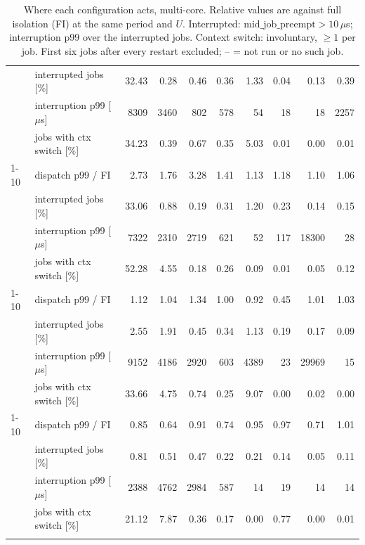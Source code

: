\begin{longtable}{ll|rrrr|rrrr}
 & interrupted jobs [\%] & 32.43 & 0.28 & 0.46 & 0.36 & 1.33 & 0.04 & 0.13 & 0.39 \\
 & interruption p99 [$\mu$s] & 8309 & 3460 & 802 & 578 & 54 & 18 & 18 & 2257 \\
 & jobs with ctx switch [\%] & 34.23 & 0.39 & 0.67 & 0.35 & 5.03 & 0.01 & 0.00 & 0.01 \\
\cmidrule{1-10}
\multirow[t]{4}{*}{IRQ steering reverted} & dispatch p99 / FI & 2.73 & 1.76 & 3.28 & 1.41 & 1.13 & 1.18 & 1.10 & 1.06 \\
 & interrupted jobs [\%] & 33.06 & 0.88 & 0.19 & 0.31 & 1.20 & 0.23 & 0.14 & 0.15 \\
 & interruption p99 [$\mu$s] & 7322 & 2310 & 2719 & 621 & 52 & 117 & 18300 & 28 \\
 & jobs with ctx switch [\%] & 52.28 & 4.55 & 0.18 & 0.26 & 0.09 & 0.01 & 0.05 & 0.12 \\
\cmidrule{1-10}
\multirow[t]{4}{*}{frequency pinning reverted} & dispatch p99 / FI & 1.12 & 1.04 & 1.34 & 1.00 & 0.92 & 0.45 & 1.01 & 1.03 \\
 & interrupted jobs [\%] & 2.55 & 1.91 & 0.45 & 0.34 & 1.13 & 0.19 & 0.17 & 0.09 \\
 & interruption p99 [$\mu$s] & 9152 & 4186 & 2920 & 603 & 4389 & 23 & 29969 & 15 \\
 & jobs with ctx switch [\%] & 33.66 & 4.75 & 0.74 & 0.25 & 9.07 & 0.00 & 0.02 & 0.00 \\
\cmidrule{1-10}
\multirow[t]{4}{*}{boot-params bundle reverted} & dispatch p99 / FI & 0.85 & 0.64 & 0.91 & 0.74 & 0.95 & 0.97 & 0.71 & 1.01 \\
 & interrupted jobs [\%] & 0.81 & 0.51 & 0.47 & 0.22 & 0.21 & 0.14 & 0.05 & 0.11 \\
 & interruption p99 [$\mu$s] & 2388 & 4762 & 2984 & 587 & 14 & 19 & 14 & 14 \\
 & jobs with ctx switch [\%] & 21.12 & 7.87 & 0.36 & 0.17 & 0.00 & 0.77 & 0.00 & 0.01 \\
\bottomrule
\caption{Where each configuration acts, multi-core. Relative values are against full isolation (FI) at the same period and $U$. Interrupted: $\mathrm{mid\_job\_preempt}>10\,\mu$s; interruption p99 over the interrupted jobs. Context switch: involuntary, $\ge 1$ per job. First six jobs after every restart excluded; -- = not run or no such job.}
\label{tab:rq1-acts-multi-core}
\end{longtable}
